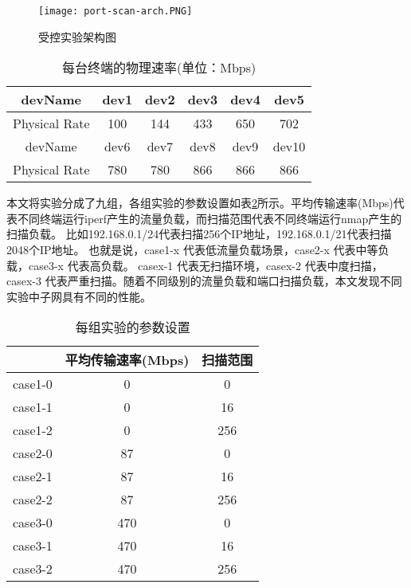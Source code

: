 \begin{figure}
  \centering
  \texttt{[image: port-scan-arch.PNG]}
  \caption{受控实验架构图}
  \label{fig:受控实验架构图}
\end{figure}

\begin{table}[h] 
  \centering  %
  \caption{每台终端的物理速率(单位：Mbps)}  %
  \label{每台终端的物理速率}
  \begin{tabular}{c|ccccc}
  \toprule  %
  devName&dev1&dev2&dev3&dev4&dev5\\
  \hline  %
  Physical Rate&100&144&433&650&702\\
  \bottomrule
  \toprule %
  devName&dev6&dev7&dev8&dev9&dev10\\
  \hline  %
  Physical Rate&780&780&866&866&866\\
  \bottomrule %
  \end{tabular}
  
  \end{table}

  本文将实验分成了九组，各组实验的参数设置如表\ref{每组实验的参数设置}所示。平均传输速率(Mbps)代表不同终端运行iperf产生的流量负载，而扫描范围代表不同终端运行nmap产生的扫描负载。 比如192.168.0.1/24代表扫描256个IP地址，192.168.0.1/21代表扫描2048个IP地址。 也就是说，case1-x 代表低流量负载场景，case2-x 代表中等负载，case3-x 代表高负载。 casex-1 代表无扫描环境，casex-2 代表中度扫描，casex-3 代表严重扫描。随着不同级别的流量负载和端口扫描负载，本文发现不同实验中子网具有不同的性能。 

\begin{table}[htb]
  \centering
  \caption{每组实验的参数设置}
  \label{每组实验的参数设置}
      \begin{tabular}{c|cc}
      \toprule  %
       &平均传输速率(Mbps)&扫描范围\\
      \hline  %
      case1-0& 0 & 0\\
      \hline %
      case1-1& 0 & 16\\
      \hline  %
      case1-2& 0 & 256\\
      \hline %
      case2-0& 87 & 0\\
      \hline %
      case2-1& 87 & 16\\
      \hline  %
      case2-2& 87 & 256\\
      \hline %
      case3-0&470 & 0\\
      \hline %
      case3-1& 470 & 16\\
      \hline  %
      case3-2& 470 & 256\\
      \bottomrule %
      \end{tabular}
\end{table}

